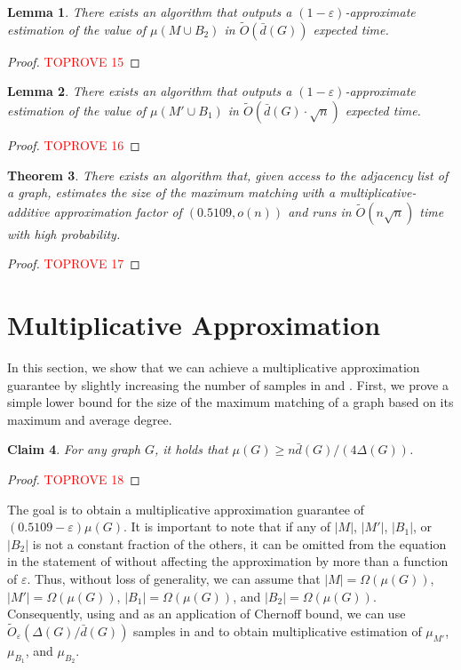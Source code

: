 \documentclass[letterpaper,11pt]{article}
\renewcommand{\epsilon}{\varepsilon}
\newcommand{\wt}[1]{\ensuremath{\widetilde{#1}}}
\newtheorem{lemma}{Lemma}[section]
\newtheorem{theorem}[lemma]{Theorem}
\newtheorem{claim}[lemma]{Claim}
\begin{document}
\begin{lemma}\label{lem:muMB}
    There exists an algorithm that outputs a $(1-\epsilon)$-approximate estimation of the value of $\mu(M \cup B_2)$ in $\wt{O}(\bar{d}(G))$ expected time.
\end{lemma}
\begin{proof}\textcolor{red}{TOPROVE 15}\end{proof}


\begin{lemma}\label{lem:muMMBB}
    There exists an algorithm that outputs a $(1-\epsilon)$-approximate estimation of the value of $\mu(M' \cup B_1)$ in $\wt{O}(\bar{d}(G) \cdot \sqrt{n})$ expected time.
\end{lemma}
\begin{proof}\textcolor{red}{TOPROVE 16}\end{proof}

\begin{theorem}
    There exists an algorithm that, given access to the adjacency list of a graph, estimates the size of the maximum matching with a multiplicative-additive approximation factor of $(0.5109, o(n))$ and runs in $\widetilde{O}(n\sqrt{n})$ time with high probability.
\end{theorem}
\begin{proof}\textcolor{red}{TOPROVE 17}\end{proof}



\section{Multiplicative Approximation}\label{sec:multiplicative}
In this section, we show that we can achieve a multiplicative approximation guarantee by slightly increasing the number of samples in  and . First, we prove a simple lower bound for the size of the maximum matching of a graph based on its maximum and average degree.

\begin{claim}\label{clm:mu-delta-d}
    For any graph $G$, it holds that $\mu(G) \geq n\bar{d}(G) / (4\Delta(G))$.
\end{claim}
\begin{proof}\textcolor{red}{TOPROVE 18}\end{proof}

The goal is to obtain a multiplicative approximation guarantee of $(0.5109 - \epsilon) \mu(G)$. It is important to note that if any of \( |M| \), \( |M'| \), \( |B_1| \), or \( |B_2| \) is not a constant fraction of the others, it can be omitted from the equation in the statement of  without affecting the approximation by more than a function of \( \epsilon \). Thus, without loss of generality, we can assume that $|M| = \Omega(\mu(G))$, $|M'| = \Omega(\mu(G))$, $|B_1| = \Omega(\mu(G))$, and $|B_2| = \Omega(\mu(G))$. Consequently, using  and as an application of Chernoff bound, we can use $\wt{O}_\epsilon(\Delta(G)/\bar{d}(G))$ samples in  and  to obtain multiplicative estimation of $\mu_{M'}$, $\mu_{B_1}$, and $\mu_{B_2}$.
\end{document}
